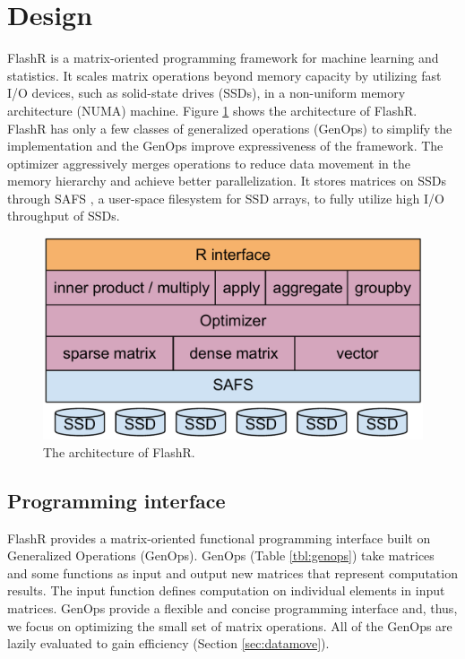 \section{Design}

FlashR is a matrix-oriented programming framework for machine learning and
statistics. It scales matrix operations beyond memory capacity by utilizing
fast I/O devices, such as solid-state drives (SSDs), in a non-uniform memory
architecture (NUMA) machine. Figure \ref{fig:arch} shows the architecture of
FlashR. FlashR has only a few classes of generalized operations (GenOps) to
simplify the implementation and the GenOps improve expressiveness of the framework. 
The optimizer aggressively merges operations to
reduce data movement in the memory hierarchy and achieve better parallelization.
It stores matrices on SSDs through SAFS \cite{safs},
a user-space filesystem for SSD arrays, to fully utilize high I/O
throughput of SSDs.

\begin{figure}
\centering
\includegraphics[scale=0.3]{FlashMatrix_figs/architecture.pdf}
\caption{The architecture of FlashR.}
\label{fig:arch}
\end{figure}

\subsection{Programming interface}

FlashR provides a matrix-oriented functional programming interface built
on Generalized Operations (GenOps).  GenOps (Table \ref{tbl:genops}) take matrices and
some functions as input and output new matrices that represent computation results.
The input function defines computation on individual elements in input matrices.
GenOps provide a flexible and concise programming interface and, thus,
we focus on optimizing the small set of matrix operations. All of
the GenOps are lazily evaluated to gain efficiency (Section
\ref{sec:datamove}).

